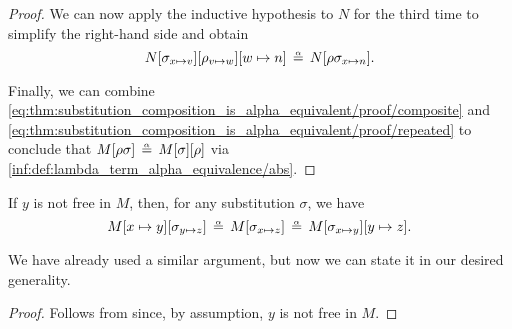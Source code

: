 \begin{proof}
  We can now apply the inductive hypothesis to \( N \) for the third time to simplify the right-hand side and obtain
  \begin{equation}\label{eq:thm:substitution_composition_is_alpha_equivalent/proof/repeated}
    N[\sigma_{x \mapsto v}][\rho_{v \mapsto w}][w \mapsto n] \aequiv N[\rho\sigma_{x \mapsto n}].
  \end{equation}

  Finally, we can combine \eqref{eq:thm:substitution_composition_is_alpha_equivalent/proof/composite} and \eqref{eq:thm:substitution_composition_is_alpha_equivalent/proof/repeated} to conclude that \( M[\rho\sigma] \aequiv M[\sigma][\rho] \) via \ref{inf:def:lambda_term_alpha_equivalence/abs}.
\end{proof}

\begin{corollary}\label{thm:substitution_chain_contraction}
  If \( y \) is not free in \( M \), then, for any substitution \( \sigma \), we have
  \begin{equation}\label{eq:thm:substitution_chain_contraction/contraction}
    M[x \mapsto y][\sigma_{y \mapsto z}]
    \aequiv
    M[\sigma_{x \mapsto z}]
    \aequiv
    M[\sigma_{x \mapsto y}][y \mapsto z].
  \end{equation}
\end{corollary}
\begin{comments}
  \item We have already used a similar argument, but now we can state it in our desired generality.
\end{comments}
\begin{proof}
  Follows from  since, by assumption, \( y \) is not free in \( M \).
\end{proof}

